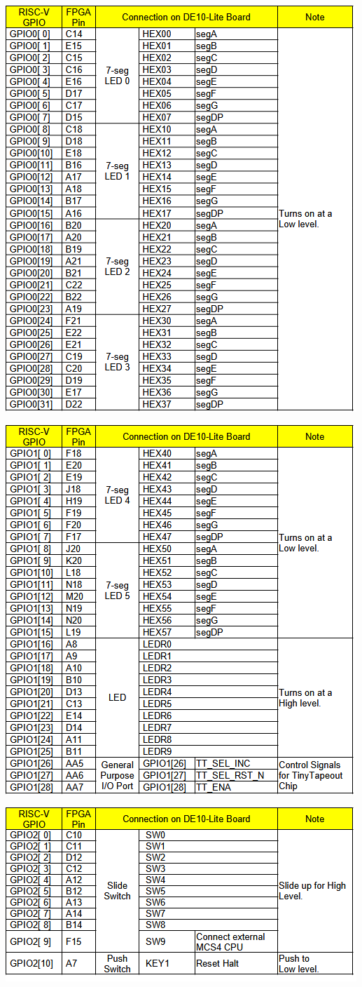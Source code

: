\begin{table}
    \includegraphics[width=0.5\columnwidth]{./Table/EXTGPIO0.png}
    \caption{GPIO0 connected to External Pins}
    \label{tb:EXTGPIO0}
\end{table}
\begin{table}
    \includegraphics[width=0.5\columnwidth]{./Table/EXTGPIO1.png}
    \caption{GPIO1 connected to External Pins}
    \label{tb:EXTGPIO1}
\end{table}
\begin{table}
    \includegraphics[width=0.5\columnwidth]{./Table/EXTGPIO2.png}
    \caption{GPIO2 connected to External Pins}
    \label{tb:EXTGPIO2}
\end{table}
